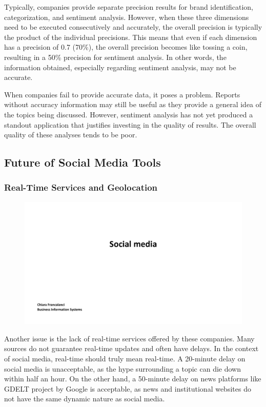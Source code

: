 Typically, companies provide separate precision results for brand
identification, categorization, and sentiment analysis. However, when
these three dimensions need to be executed consecutively and accurately,
the overall precision is typically the product of the individual
precisions. This means that even if each dimension has a precision of
0.7 (70\%), the overall precision becomes like tossing a coin, resulting
in a 50\% precision for sentiment analysis. In other words, the
information obtained, especially regarding sentiment analysis, may not
be accurate.

When companies fail to provide accurate data, it poses a problem.
Reports without accuracy information may still be useful as they provide
a general idea of the topics being discussed. However, sentiment
analysis has not yet produced a standout application that justifies
investing in the quality of results. The overall quality of these
analyses tends to be poor.

\subsection{Future of Social Media
  Tools}\label{future-of-social-media-tools}

\subsubsection{Real-Time Services and
  Geolocation}\label{real-time-services-and-geolocation}

\begin{figure}[!h]
  \centering
  \includegraphics[page=32, trim = 1cm 4.5cm 1cm 3cm, clip, width=\imagewidth]{images/04 - Social_Media.pdf}
\end{figure}

Another issue is the lack of real-time services offered by these
companies. Many sources do not guarantee real-time updates and often
have delays. In the context of social media, real-time should truly mean
real-time. A 20-minute delay on social media is unacceptable, as the
hype surrounding a topic can die down within half an hour. On the other
hand, a 50-minute delay on news platforms like GDELT project by Google is
acceptable, as news and institutional websites do not have the same
dynamic nature as social media.

